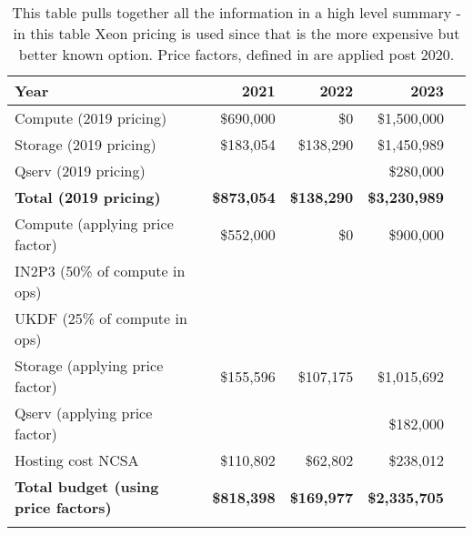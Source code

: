 \tiny \begin{longtable} { |p{}  |r  |r  |r  |r |} 
\caption{This table pulls together all the information in a high level summary - in this table Xeon pricing is used since that is the more expensive but better known option. Price factors, defined in  are applied post 2020.
 \label{tab:Summary}}\\ 
\hline 
\textbf{Year}&\textbf{2021}&\textbf{2022}&\textbf{2023} \\ \hline
{Compute (2019 pricing)}&{\$690,000}&{\$0}&{\$1,500,000} \\ \hline
{Storage (2019 pricing)}&{\$183,054}&{\$138,290}&{\$1,450,989} \\ \hline
{Qserv (2019 pricing)}&{}&{}&{\$280,000} \\ \hline
\textbf{Total (2019 pricing)}&\textbf{\$873,054}&\textbf{\$138,290}&\textbf{\$3,230,989} \\ \hline
{Compute (applying price factor)}&{\$552,000}&{\$0}&{\$900,000} \\ \hline
{IN2P3 (50\% of compute in ops)}&{}&{}&{} \\ \hline
{UKDF (25\% of compute in ops)}&{}&{}&{} \\ \hline
{Storage (applying price factor)}&{\$155,596}&{\$107,175}&{\$1,015,692} \\ \hline
{Qserv (applying price factor)}&{}&{}&{\$182,000} \\ \hline
{Hosting cost NCSA
}&{\$110,802}&{\$62,802}&{\$238,012} \\ \hline
\textbf{Total budget (using price factors)}&\textbf{\$818,398}&\textbf{\$169,977}&\textbf{\$2,335,705} \\ \hline
{}&{}&{}&{} \\ \hline
\end{longtable} \normalsize

